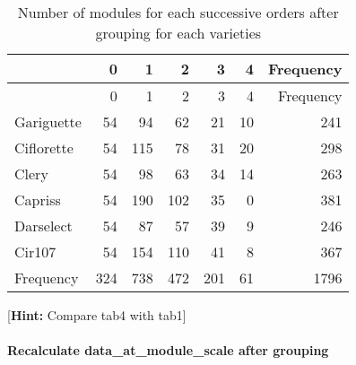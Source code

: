 \documentclass[]{article}
\let\oldparagraph\paragraph
\renewcommand{\paragraph}[1]{\oldparagraph{#1}\mbox{}}
\begin{document}
\begin{longtable}[]{@{}lrrrrrr@{}}
\caption{Number of modules for each successive orders after grouping for
each varieties}\tabularnewline
\toprule
& 0 & 1 & 2 & 3 & 4 & Frequency\tabularnewline
\midrule
\endfirsthead
\toprule
& 0 & 1 & 2 & 3 & 4 & Frequency\tabularnewline
\midrule
\endhead
Gariguette & 54 & 94 & 62 & 21 & 10 & 241\tabularnewline
Ciflorette & 54 & 115 & 78 & 31 & 20 & 298\tabularnewline
Clery & 54 & 98 & 63 & 34 & 14 & 263\tabularnewline
Capriss & 54 & 190 & 102 & 35 & 0 & 381\tabularnewline
Darselect & 54 & 87 & 57 & 39 & 9 & 246\tabularnewline
Cir107 & 54 & 154 & 110 & 41 & 8 & 367\tabularnewline
Frequency & 324 & 738 & 472 & 201 & 61 & 1796\tabularnewline
\bottomrule
\end{longtable}

{[}\textbf{Hint:} Compare tab4 with tab1{]}

\paragraph{Recalculate data\_at\_module\_scale after
grouping}\label{recalculate-data_at_module_scale-after-grouping}
\end{document}
